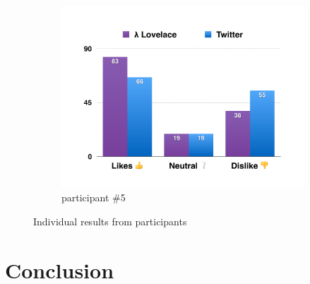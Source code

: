 \documentclass{article}
\begin{document}
\begin{figure}
    \begin{subfigure}[b]{0.48\textwidth}
        \includegraphics[page=5,width=\textwidth]{evaluation_charts}
        \caption{participant \#5}
        \label{fig:participant5}
    \end{subfigure}
    
    \vspace{2em}
    
    \caption{Individual results from participants}
    \label{fig:evaluation-results}
\end{figure}



\newpage





































\section{Conclusion} 
\end{document}
